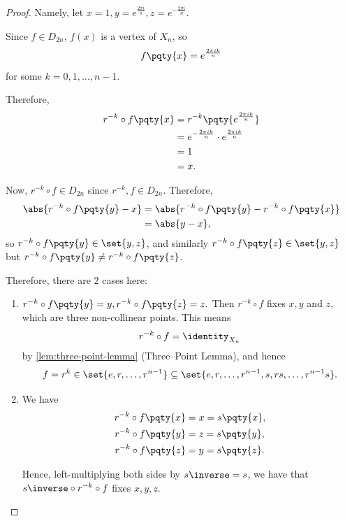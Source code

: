 \begin{proof}
    Namely, let \(x = 1, y = e^{\frac{2 \pi i}{n}}, z = e^{- \frac{2 \pi i}{n}}\).

    Since \(f \in D_{2n}\), \(f(x)\) is a vertex of \(X_n\), so
    \[
        f\pqty{x} = e^{\frac{2 \pi i k}{n}}
    \]
    for some \(k = 0, 1, \ldots, n - 1\).

    Therefore,
    \begin{align*}
        r^{-k} \circ f \pqty{x} &= r^{-k} \pqty{e^{\frac{2 \pi i k}{n}}} \\
        &= e^{- \frac{2 \pi i k}{n}} \cdot e^{\frac{2 \pi i k}{n}} \\
        &= 1 \\
        &= x.
    \end{align*}

    Now, \(r^{-k} \circ f \in D_{2n}\) since \(r^{-k}, f \in D_{2n}\). Therefore,
    \begin{align*}
        \abs{r^{-k} \circ f \pqty{y} - x} &= \abs{r^{-k} \circ f \pqty{y} - r^{-k} \circ f \pqty{x}} \\
        &= \abs{y - x},
    \end{align*}
    so \(r^{-k} \circ f \pqty{y} \in \set{y, z}\), and similarly \(r^{-k} \circ f \pqty{z} \in \set{y, z}\) but \(r^{-k} \circ f \pqty{y} \neq r^{-k} \circ f \pqty{z}\).

    Therefore, there are \(2\) cases here:
    \begin{enumerate}
        \item \(r^{-k} \circ f \pqty{y} = y, r^{-k} \circ f \pqty{z} = z.\) Then \(r^{-k} \circ f\) fixes \(x, y\) and \(z\), which are three non-collinear points. This means
        \[
            r^{-k} \circ f = \identity_{X_n}
        \]
        by \autoref{lem:three-point-lemma} (Three--Point Lemma), and hence
        \[
            f = r^k \in \set{e, r, \ldots, r^{n - 1}} \subseteq \set{e, r, \ldots, r^{n - 1}, s, rs, \ldots, r^{n - 1}s}.
        \]

        \item We have
        \begin{align*}
            r^{-k} \circ f \pqty{x} &= x = s\pqty{x}, \\
            r^{-k} \circ f \pqty{y} &= z = s\pqty{y}, \\
            r^{-k} \circ f \pqty{z} &= y = s\pqty{z}.
        \end{align*}

        Hence, left-multiplying both sides by \(s\inverse = s\), we have that \(s\inverse \circ r^{-k} \circ f\) fixes \(x, y, z\).


\end{enumerate}
\end{proof}
